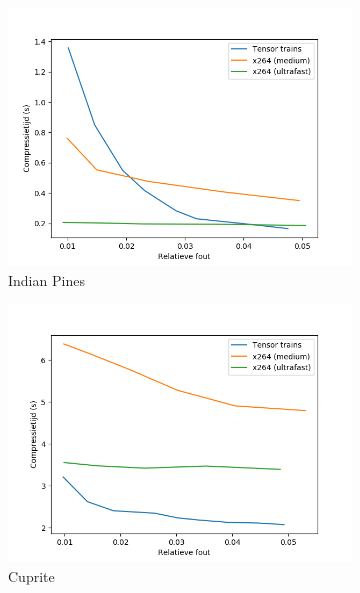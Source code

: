\begin{figure}[H]
\centering
\begin{subfigure}{0.48\textwidth}
  \centering
  \includegraphics[width=\linewidth]{images/general_comparison_times_Indian_Pines.png}
  \caption{Indian Pines}
\end{subfigure}
\begin{subfigure}{0.48\textwidth}
  \centering
  \includegraphics[width=\linewidth]{images/general_comparison_times_Cuprite.png}
  \caption{Cuprite}
\end{subfigure}
\\
\begin{subfigure}{0.48\textwidth}
  \centering

\end{subfigure}
\end{figure}
